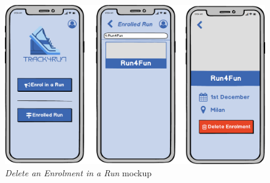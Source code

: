 \begin{figure}[H]
\begin{center}
  \includegraphics[width=\textwidth]{img/mockup/DeleteEnrolment.png}
  \hspace{0.05\linewidth}
  \centering
  \caption{\textit{Delete an Enrolment in a Run} mockup}
  \label{img:deleteEnrolmentMockup}
\end{center}
\end{figure}
